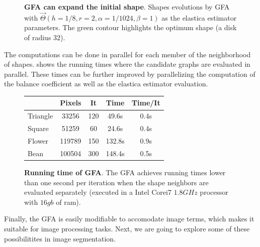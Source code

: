\documentclass[review]{siamart220329}
\begin{document}
\begin{figure}
\caption{\textbf{GFA can expand the initial shape}. Shapes evolutions by GFA with $\vec{\Theta}(h=1/8,r=2,\alpha=1/1024, \beta=1)$ as the elastica estimator parameters. The green contour highlights the optimum shape (a disk of radius $32$).}
\label{fig:graph-flow-expand}
\end{figure}
%
%
The computations can be done in parallel for each member of the neighborhood of shapes.  shows the running times where the candidate graphs are evaluated in parallel. These times can be further improved by parallelizing the computation of the balance coefficient as well as the elastica estimator evaluation.
%
%
\begin{figure}[h!]
\center
\captionsetup{type=table}
\footnotesize
	\caption{\textbf{Running time of GFA}. The GFA achieves running times lower than one second per iteration when the shape neighbors are evaluated separately (executed in a Intel Corei7 $1.8GHz$ processor with $16gb$ of ram). }\label{tab:summary-graph-flow-running-time} 
\begin{tabular}{|l|c|c|c|c|}
\hline
& Pixels & It & Time & Time/It\\
\hline
Triangle & 33256 & 120 & 49.6s & 0.4s \\
Square & 51259 & 60 & 24.6s & 0.4s \\
Flower & 119789 & 150 & 132.8s & 0.9s \\
Bean & 100504 & 300 & 148.4s & 0.5s \\
\hline
\end{tabular}
\end{figure}
%
%
Finally, the GFA is easily modifiable to accomodate image terms, which makes it suitable for image processing tasks. Next, we are going to explore some of these possibilitites in image segmentation.
%
%
\end{document}
